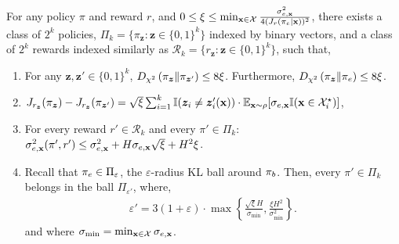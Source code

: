 \begin{lemma}
\label{lem:packing}
For any policy $\pi$ and reward $r$, and $0 \leq \xi \leq \min_{\mathbf{x} \in \mathcal{X}} \frac{\sigma_{e,\mathbf{x}}^2}{4(J_r(\pi_e|\mathbf{x}))^2}$, there exists a class of $2^k$ policies, $\Pi_k = \{ \pi_{\bm{z}} : \bm{z} \in \{ 0,1 \}^k \}$ indexed by binary vectors, and a class of $2^k$ rewards indexed similarly as $\mathcal{R}_k = \{ r_{\bm{z}} : \bm{z} \in \{ 0,1 \}^k \}$, such that,
\begin{enumerate}
    \item For any $\bm{z}, \bm{z}' \in \{ 0,1 \}^k$, $D_{\chi^2} \left( \pi_{\bm{z}} \| \pi_{\bm{z}'} \right) \le 8\xi$. Furthermore, $D_{\chi^2} \left( \pi_{\bm{z}} \| \pi_e \right) \le 8\xi$.
    \item $J_{r_{\bm{z}}} (\pi_{\bm{z}}) - J_{r_{\bm{z}}} (\pi_{\bm{z}'}) = \sqrt{\xi} \sum_{i=1}^k \mathbb{I} (\bm{z}_i \ne \bm{z}'_i (\mathbf{x})) \cdot \mathbb{E}_{\mathbf{x} \sim \rho} [ \sigma_{e,\mathbf{x}} \mathbb{I} (\mathbf{x} \in \mathcal{X}^\star_i)]$,
    \item For every reward $r' \in \mathcal{R}_k$ and every $\pi' \in \Pi_k$: $\sigma_{e,\mathbf{x}}^2 (\pi',r') \le \sigma_{e,\mathbf{x}}^2 + H \sigma_{e,\mathbf{x}} \sqrt{\xi} + H^2 \xi$.
    \item Recall that $\pi_e \in \Pi_\varepsilon$, the $\varepsilon$-radius KL ball around $\pi_b$. Then, every $\pi' \in \Pi_k$ belongs in the ball $\Pi_{\varepsilon'}$, where,
    \begin{align}
        \varepsilon' = 3 (1+\varepsilon) \cdot \max \left\{ \frac{\sqrt{\xi} H}{\sigma_{\min}} , \frac{\xi H^2}{\sigma_{\min}^2} \right\}.
    \end{align}
    and where $\sigma_{\min} = \min_{\mathbf{x} \in \mathcal{X}} \sigma_{e,\mathbf{x}}$.
\end{enumerate}
\end{lemma}
